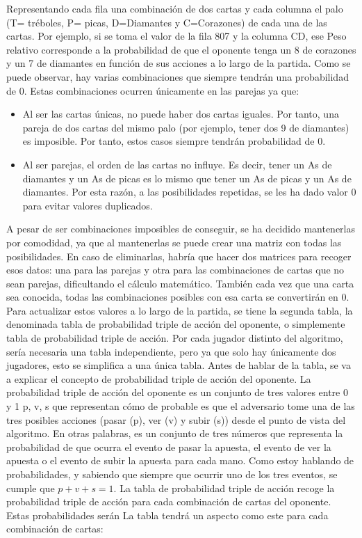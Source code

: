\begin{itemize}
Representando cada fila una combinación de dos cartas y cada columna el palo (T= tréboles, P= picas, D=Diamantes y C=Corazones) de cada una de las cartas. Por ejemplo, si se toma el valor de la fila 807 y la columna CD, ese Peso relativo corresponde a la probabilidad de que el oponente tenga un 8 de corazones y un 7 de diamantes en función de sus acciones a lo largo de la partida.
Como se puede observar, hay varias combinaciones que siempre tendrán una probabilidad de 0. Estas combinaciones ocurren únicamente en las parejas ya que:
\begin{itemize} 
\item Al ser las cartas únicas, no puede haber dos cartas iguales. Por tanto, una pareja de dos cartas del mismo palo (por ejemplo, tener dos 9 de diamantes) es imposible. Por tanto, estos casos siempre tendrán probabilidad de 0.
\item Al ser parejas, el orden de las cartas no influye. Es decir, tener un As de diamantes y un As de picas es lo mismo que tener un As de picas y un As de diamantes. Por esta razón, a las posibilidades repetidas, se les ha dado valor 0 para evitar valores duplicados.
\end{itemize} 
A pesar de ser combinaciones imposibles de conseguir, se ha decidido mantenerlas por comodidad, ya que al mantenerlas se puede crear una matriz con todas las posibilidades. En caso de eliminarlas, habría que hacer dos matrices para recoger esos datos: una para las parejas y otra para las combinaciones de cartas que no sean parejas, dificultando el cálculo matemático.
También cada vez que una carta sea conocida, todas las combinaciones posibles con esa carta se convertirán en 0.
Para actualizar estos valores a lo largo de la partida, se tiene la segunda tabla, la denominada tabla de probabilidad triple de acción del oponente, o simplemente tabla de probabilidad triple de acción. Por cada jugador distinto del algoritmo, sería necesaria una tabla independiente, pero ya que solo hay únicamente dos jugadores, esto se simplifica a una única tabla.
Antes de hablar de la tabla, se va a explicar el concepto de probabilidad triple de acción del oponente. La probabilidad triple de acción del oponente es un conjunto de tres valores entre 0 y 1 {p, v, s} que representan cómo de probable es que el adversario tome una de las tres posibles acciones (pasar (p), ver (v) y subir (s)) desde el punto de vista del algoritmo. En otras palabras, es un conjunto de tres números que representa la probabilidad de que ocurra el evento de pasar la apuesta, el evento de ver la apuesta o el evento de subir la apuesta para cada mano.
Como estoy hablando de probabilidades, y sabiendo que siempre que ocurrir uno de los tres eventos, se cumple que $ p+v+s=1$.
La tabla de probabilidad triple de acción recoge la probabilidad triple de acción para cada combinación de cartas del oponente. Estas probabilidades serán
La tabla tendrá un aspecto como este para cada combinación de cartas:



\end{itemize}
